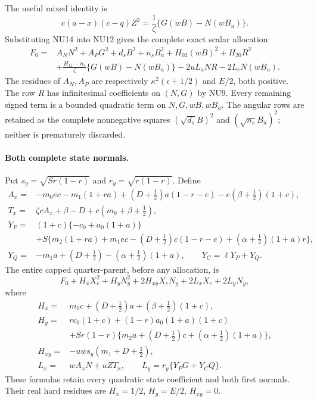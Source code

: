 The useful mixed identity is
\[
 c(a-x)(c-q)Z^2=\frac1\zeta\{G(wB)-N(wB_u)\}.
 \tag{NU15}
\]
Substituting NU14 into NU12 gives the complete exact scalar
allocation
\[
\begin{split}
 F_0={}&A_NN^2+A_PG^2+d_sB^2+n_sB_u^2
       +H_{02}(wB)^2+H_{20}R^2\\
 &+\frac{H_{11}-n_s}{\zeta}\{G(wB)-N(wB_u)\}
       -2uL_aNR-2L_cN(wB_u).
\end{split}\tag{NU16}
\]
The residues of $A_N,A_P$ are respectively
$\kappa^2(\epsilon+1/2)$ and $E/2$, both positive.
The row $R$ has infinitesimal coefficients on $(N,G)$ by NU9.
Every remaining signed term is a bounded quadratic term on
$N,G,wB,wB_u$. The angular rows are retained as the complete
nonnegative squares $(\sqrt{d_s}B)^2$ and
$(\sqrt{n_s}B_u)^2$; neither is prematurely discarded.

\paragraph{Both complete state normals.}
Put $s_y=\sqrt{Sr(1-r)}$ and $r_y=\sqrt{r(1-r)}$.
Define
\[
\begin{split}
 A_x={}&-m_0ec-m_1(1+ra)+(D+\tfrac12)a(1-r-e)
                          -e(\beta+\tfrac12)(1+c),\\
 T_x={}&\zeta cA_x+\beta-D+c(m_0+\beta+\tfrac12),\\
 Y_P={}&(1+c)\{-c_0+a_0(1+a)\}\\
 &+S\{m_2(1+ra)+m_1ec-(D+\tfrac12)c(1-r-e)
                             +(\alpha+\tfrac12)(1+a)r\},\\
 Y_Q={}&-m_1a+(D+\tfrac12)-(\alpha+\tfrac12)(1+a),\qquad
 Y_C=\ell Y_P+Y_Q.
\end{split}\tag{NU17}
\]
The entire capped quarter-parent, before any allocation, is
\[
 F_0+H_xX_e^2+H_yN_y^2+2H_{xy}X_eN_y+2L_xX_e+2L_yN_y,
 \tag{NU18}
\]
where
\[
\begin{split}
 H_x={}&m_0c+(D+\tfrac12)a+(\beta+\tfrac12)(1+c),\\
 H_y={}&rc_0(1+c)+(1-r)a_0(1+a)(1+c)\\
 &+Sr(1-r)\{m_2a+(D+\tfrac12)c+(\alpha+\tfrac12)(1+a)\},\\
 H_{xy}={}&-uws_y(m_1+D+\tfrac12),\\
 L_x={}&wA_xN+uZT_x,\qquad
 L_y=r_y\{Y_PG+Y_CQ\}.
\end{split}\tag{NU19}
\]
These formulas retain every quadratic state coefficient and both
first normals. Their real hard residues are
$H_x=1/2$, $H_y=E/2$, $H_{xy}=0$.

